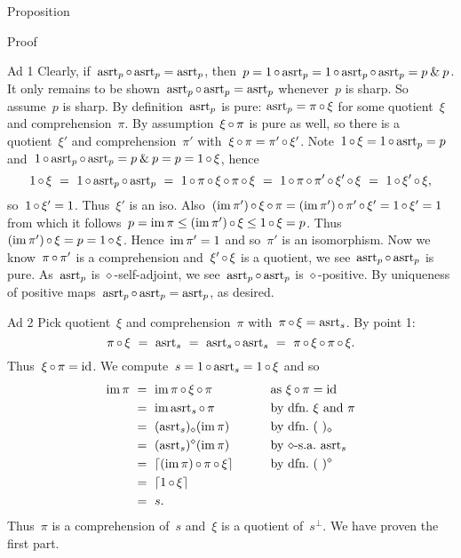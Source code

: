 \documentclass[b]{subfiles}
\begin{document}
\begin{parsec}
\begin{point}{Proposition}
\begin{point}{Proof}
\begin{point}{Ad 1}
Clearly, if~$\mathrm{asrt}_p \mathop{\circ} \mathrm{asrt}_p = \mathrm{asrt}_p$,
then~$p = 1 \mathop{\circ} \mathrm{asrt}_p = 1\mathop{\circ}\mathrm{asrt}_p\mathop{\circ}\mathrm{asrt}_p = p \mathbin{\&} p$.
It only remains to be shown~$\mathrm{asrt}_p \mathop{\circ} \mathrm{asrt}_p = \mathrm{asrt}_p$
    whenever~$p$ is sharp.
So assume~$p$ is sharp.
By definition~$\mathrm{asrt}_p$ is pure: $\mathrm{asrt}_p = \pi \mathop{\circ} \xi$
    for some quotient~$\xi$ and comprehension~$\pi$.
By assumption~$\xi \mathop{\circ} \pi$ is pure as well,
    so there is a quotient~$\xi'$ and comprehension~$\pi'$
    with~$\xi \mathop{\circ} \pi = \pi' \mathop{\circ} \xi'$.
Note~$1 \mathop{\circ} \xi = 1 \mathop{\circ} \mathrm{asrt}_p = p$
and~$1 \mathop{\circ} \mathrm{asrt}_p \mathop{\circ} \mathrm{asrt}_p = p \mathbin{\&} p = p = 1 \mathop{\circ} \xi$,
hence
\begin{equation*}
 1\mathop{\circ} \xi  
    \ =\  1 \mathop{\circ} \mathrm{asrt}_p \mathop{\circ} \mathrm{asrt}_p 
    \ =\  1 \mathop{\circ} \pi \mathop{\circ} \xi \mathop{\circ} \pi \mathop{\circ} \xi 
    \ =\  1 \mathop{\circ} \pi \mathop{\circ} \pi' \mathop{\circ} \xi' \mathop{\circ} \xi 
    \ =\  1 \mathop{\circ} \xi' \mathop{\circ} \xi,
\end{equation*}
so~$1 \mathop{\circ} \xi' = 1$. Thus~$\xi'$ is an iso.
Also~$
    (\operatorname{im} \pi') \mathop{\circ} \xi \mathop{\circ} \pi
    = (\operatorname{im} \pi') \mathop{\circ} \pi' \mathop{\circ} \xi'
    = 1 \mathop{\circ} \xi' = 1 $
    from which it follows~$p = \operatorname{im} \pi \leq  (\operatorname{im} \pi') \mathop{\circ} \xi 
            \leq 1 \mathop{\circ} \xi = p$.
Thus~$(\operatorname{im} \pi') \mathop{\circ} \xi = p = 1\mathop{\circ} \xi$.
Hence~$\operatorname{im} \pi' = 1$ and so~$\pi'$ is an isomorphism.
Now we know~$\pi \mathop{\circ} \pi'$
    is a comprehension and~$\xi' \mathop{\circ} \xi$ is a quotient,
    we see~$\mathrm{asrt}_p\mathop{\circ}\mathrm{asrt}_p$ is pure.
As~$\mathrm{asrt}_p$ is $\diamond$-self-adjoint,
    we see~$\mathrm{asrt}_p\mathop{\circ}\mathrm{asrt}_p$ is $\diamond$-positive.
By uniqueness of positive maps~$\mathrm{asrt}_p \mathop{\circ} \mathrm{asrt}_p = \mathrm{asrt}_p$,
    as desired.
\end{point}
\begin{point}{Ad 2}%
Pick quotient~$\xi$ and comprehension~$\pi$
    with~$\pi \mathop{\circ} \xi = \mathrm{asrt}_s$.
By point 1:
\begin{equation*}
   \pi \after \xi \ =\  \asrt_s \ =\  \asrt_s\after\asrt_s \ =\  \pi \after \xi \after \pi \after \xi.
\end{equation*}
Thus~$\xi \mathop{\circ} \pi = \operatorname{id}$.
We compute~$s = 1 \mathop{\circ} \mathrm{asrt}_s = 1 \mathop{\circ} \xi$
and so
\begin{alignat*}{2}
    \IM \pi &\ = \ 
    \IM \pi \after \xi \after \pi &\qquad& \text{as $\xi \after \pi=\id$}\\
                  &\ = \ \IM \asrt_s \after \pi &&\text{by dfn.~$\xi$ and~$\pi$}\\
                  &\ = \ (\asrt_s)_{\diamond}(\IM \pi)&& \text{by dfn.~$(\ )_\diamond$} \\
                  & \ = \ (\asrt_s)^{\diamond}(\IM \pi)&&
        \text{by $\diamond$-s.a.~$\asrt_s$}\\
        &\ = \ \ceil{(\IM \pi) \after \pi \after \xi} && \text{by dfn.~$(\ )^\diamond$} \\
&\ = \ \ceil{1 \after \xi} \\
    & \ = \ s.
\end{alignat*}
Thus~$\pi$ is a comprehension of~$s$
and~$\xi$ is a quotient of~$s^\perp$.
We have proven the first part.


\end{point}
\end{point}
\end{point}
\end{parsec}
\end{document}
